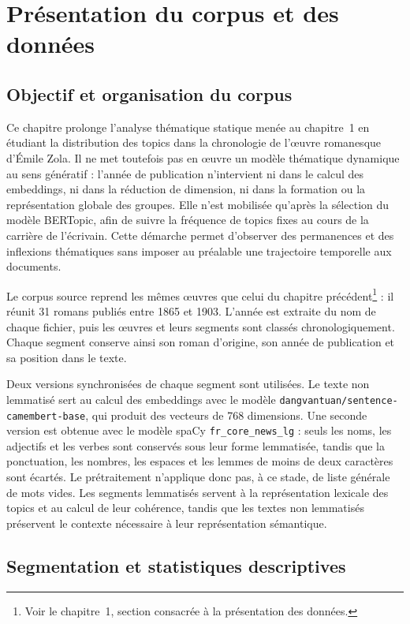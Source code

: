 \section{Présentation du corpus et des données}

\subsection{Objectif et organisation du corpus}

Ce chapitre prolonge l'analyse thématique statique menée au chapitre~1 en étudiant la distribution des topics dans la chronologie de l'œuvre romanesque d'Émile Zola. Il ne met toutefois pas en œuvre un modèle thématique dynamique au sens génératif : l'année de publication n'intervient ni dans le calcul des embeddings, ni dans la réduction de dimension, ni dans la formation ou la représentation globale des groupes. Elle n'est mobilisée qu'après la sélection du modèle BERTopic, afin de suivre la fréquence de topics fixes au cours de la carrière de l'écrivain. Cette démarche permet d'observer des permanences et des inflexions thématiques sans imposer au préalable une trajectoire temporelle aux documents.

Le corpus source reprend les mêmes œuvres que celui du chapitre précédent\footnote{Voir le chapitre~1, section consacrée à la présentation des données.} : il réunit 31 romans publiés entre 1865 et 1903. L'année est extraite du nom de chaque fichier, puis les œuvres et leurs segments sont classés chronologiquement. Chaque segment conserve ainsi son roman d'origine, son année de publication et sa position dans le texte.

Deux versions synchronisées de chaque segment sont utilisées. Le texte non lemmatisé sert au calcul des embeddings avec le modèle \texttt{dangvantuan/\allowbreak sentence-\allowbreak camembert-\allowbreak base}, qui produit des vecteurs de 768 dimensions. Une seconde version est obtenue avec le modèle spaCy \texttt{fr\_core\_news\_lg} : seuls les noms, les adjectifs et les verbes sont conservés sous leur forme lemmatisée, tandis que la ponctuation, les nombres, les espaces et les lemmes de moins de deux caractères sont écartés. Le prétraitement n'applique donc pas, à ce stade, de liste générale de mots vides.
 Les segments lemmatisés servent à la représentation lexicale des topics et au calcul de leur cohérence, tandis que les textes non lemmatisés préservent le contexte nécessaire à leur représentation sémantique.

\subsection{Segmentation et statistiques descriptives}

